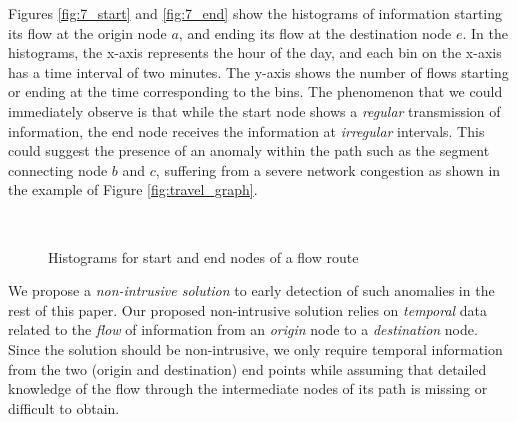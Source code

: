 \documentclass[conference]{IEEEtran.1.8}
\begin{document}
Figures \ref{fig:7_start} and \ref{fig:7_end} show the histograms of information starting its flow at the origin node $a$, and ending its flow at the destination node $e$. In the histograms, the x-axis represents the hour of the day, and each bin on the x-axis has a time interval of two minutes. The y-axis shows the number of flows starting or ending at the time corresponding to the bins. The phenomenon that we could immediately observe is that while the start node shows a \emph{regular} transmission of information, the end node receives the information at \emph{irregular} intervals. This could suggest the presence of an anomaly within the path such as the segment connecting node $b$ and $c$, suffering from a severe network congestion as shown in the example of Figure \ref{fig:travel_graph}.
\begin{figure}[htb]
	\centering
	\\
	\caption{Histograms for start and end nodes of a flow route}
	\label{fig:7}
\end{figure}

We propose a \emph{non-intrusive solution} to early detection of such anomalies in the rest of this paper. Our proposed non-intrusive solution relies on \emph{temporal} data related to the \emph{flow} of information from an \emph{origin} node to a \emph{destination} node. Since the solution should be non-intrusive, we only require temporal information from the two (origin and destination) end points while assuming that detailed knowledge of the flow through the intermediate nodes of its path is missing or difficult to obtain.
\end{document}
